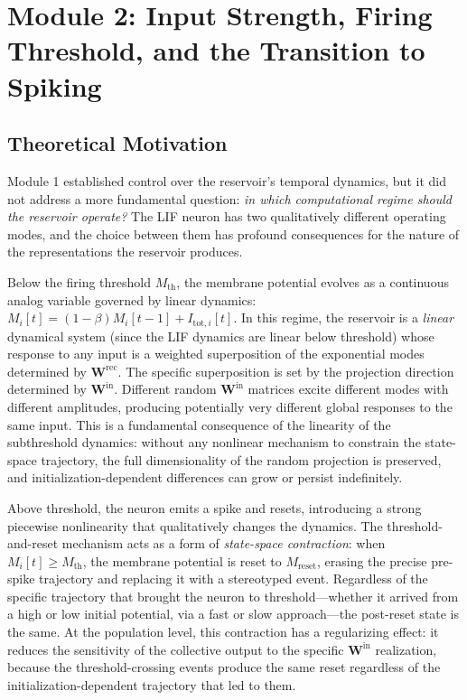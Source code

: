 \section{Module 2: Input Strength, Firing Threshold, and the Transition to Spiking}
\label{sec:module2}

\subsection{Theoretical Motivation}

Module 1 established control over the reservoir's temporal dynamics, but it did not address a more fundamental question: \emph{in which computational regime should the reservoir operate?} The LIF neuron has two qualitatively different operating modes, and the choice between them has profound consequences for the nature of the representations the reservoir produces.

Below the firing threshold $M_{\text{th}}$, the membrane potential evolves as a continuous analog variable governed by linear dynamics: $M_i[t] = (1 - \beta) M_i[t-1] + I_{\text{tot},i}[t]$. In this regime, the reservoir is a \emph{linear} dynamical system (since the LIF dynamics are linear below threshold) whose response to any input is a weighted superposition of the exponential modes determined by $\mathbf{W}^{\text{rec}}$. The specific superposition is set by the projection direction determined by $\mathbf{W}^{\text{in}}$. Different random $\mathbf{W}^{\text{in}}$ matrices excite different modes with different amplitudes, producing potentially very different global responses to the same input. This is a fundamental consequence of the linearity of the subthreshold dynamics: without any nonlinear mechanism to constrain the state-space trajectory, the full dimensionality of the random projection is preserved, and initialization-dependent differences can grow or persist indefinitely.

Above threshold, the neuron emits a spike and resets, introducing a strong piecewise nonlinearity that qualitatively changes the dynamics. The threshold-and-reset mechanism acts as a form of \emph{state-space contraction}: when $M_i[t] \geq M_{\text{th}}$, the membrane potential is reset to $M_{\text{reset}}$, erasing the precise pre-spike trajectory and replacing it with a stereotyped event. Regardless of the specific trajectory that brought the neuron to threshold---whether it arrived from a high or low initial potential, via a fast or slow approach---the post-reset state is the same. At the population level, this contraction has a regularizing effect: it reduces the sensitivity of the collective output to the specific $\mathbf{W}^{\text{in}}$ realization, because the threshold-crossing events produce the same reset regardless of the initialization-dependent trajectory that led to them.

